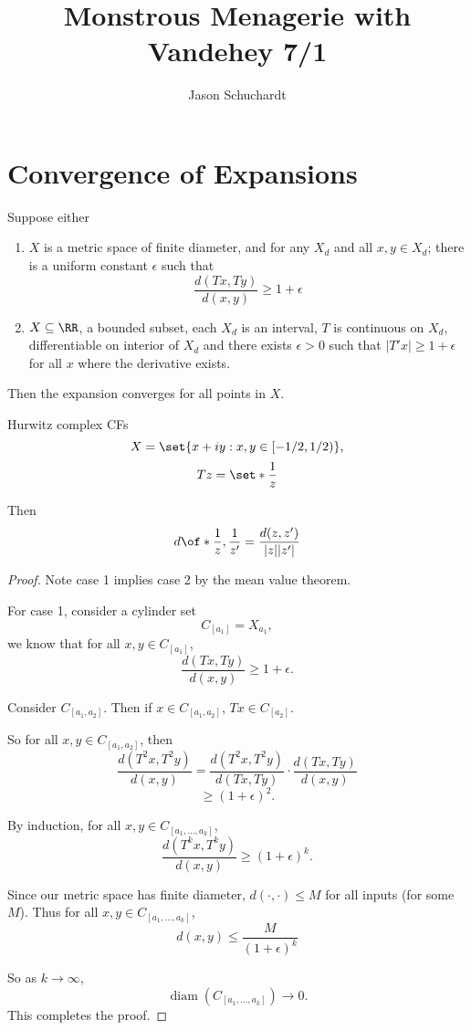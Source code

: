\documentclass{article}
\title{Monstrous Menagerie with Vandehey 7/1}
\author{Jason Schuchardt}
\newcommand\cylset[1]{C_{[{#1}]}}
\newcommand\diam{\operatorname{diam}}
\begin{document}
\section{Convergence of Expansions}

\begin{theorem}
    Suppose either 
    \begin{enumerate}
        \item $X$ is a metric space of finite diameter, and for any $X_d$ and all $x,y\in X_d$; there is
            a uniform constant $\epsilon$ such that
            \[ \frac{d(Tx,Ty)}{d(x,y)} \ge 1+\epsilon \]
        \item $X\subseteq \RR$, a bounded subset, each $X_d$ is an interval, $T$ is continuous on $X_d$,
            differentiable on interior of $X_d$ and there exists $\epsilon > 0$ such that 
            $|T'x| \ge 1+\epsilon$ for all $x$ where the derivative exists.
    \end{enumerate}

    Then the expansion converges for all points in $X$.
\end{theorem}

\begin{example}
    Hurwitz complex CFs 
    \[ X = \set{x+iy : x,y \in [-1/2, 1/2)},\]
    \[ Tz = \set*{\frac{1}{z}}\]

    Then 
    \[ d\of*{\frac{1}{z}, \frac{1}{z'}} = \frac{d(z,z')}{|z||z'|}\]
\end{example}

\begin{proof}
    Note case 1 implies case 2 by the mean value theorem.

    For case 1, consider a cylinder set \[C_{[a_1]} = X_{a_1},\]
    we know that for all $x,y\in C_{[a_1]}$,
    \[ \frac{d(Tx,Ty)}{d(x,y)} \ge 1 +\epsilon. \]

    Consider $\cylset{a_1,a_2}$. 
    Then if $x\in \cylset{a_1,a_2}$, $Tx\in \cylset{a_2}$.

    So for all $x,y\in \cylset{a_1,a_2}$, then 
    \[ \frac{d(T^2x,T^2y)}{d(x,y)} = \frac{d(T^2x,T^2y)}{d(Tx,Ty)} \cdot 
    \frac{d(Tx,Ty)}{d(x,y)} \]
    \[ \ge (1+\epsilon)^2. \]

    By induction, for all $x,y\in \cylset{a_1,\ldots,a_k}$,
    \[ \frac{d(T^kx,T^ky)}{d(x,y)} \ge (1+\epsilon)^k.\]

    Since our metric space has finite diameter, 
    $d(\cdot, \cdot) \le M$ for all inputs (for some $M$). 
    Thus for all $x,y\in \cylset{a_1,\ldots,a_k}$, 
    \[ d(x,y) \le \frac{M}{(1+\epsilon)^k} \]

    So as $k\to \infty$, 
    \[ \diam(\cylset{a_1,\ldots,a_k}) \to 0.\]
    This completes the proof.
\end{proof}
\end{document}
